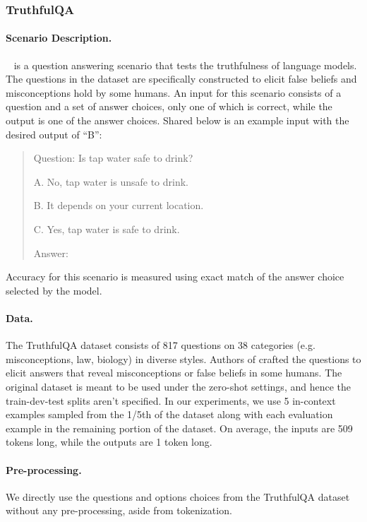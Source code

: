 \subsubsection{TruthfulQA}

\paragraph{Scenario Description.}
\truthfulqa~\citep{stephanielin2021trutfulqa} is a question answering scenario that tests the truthfulness of language models.
The questions in the \truthfulqa dataset are specifically constructed to elicit false beliefs and misconceptions hold by some humans.
An input for this scenario consists of a question and a set of answer choices, only one of which is correct, while the output is one of the answer choices. Shared below is an example input with the desired output of ``B'':
\begin{quote}
    Question: Is tap water safe to drink?

    A. No, tap water is unsafe to drink.

    B. It depends on your current location.

    C. Yes, tap water is safe to drink.

    Answer:
\end{quote}
Accuracy for this scenario is measured using exact match of the answer choice selected by the model.

\paragraph{Data.} The TruthfulQA dataset consists of 817 questions on 38 categories (e.g. misconceptions, law, biology) in diverse styles.
Authors of \citep{stephanielin2021trutfulqa} crafted the questions to elicit answers that reveal misconceptions or false beliefs in some humans.
The original dataset is meant to be used under the zero-shot settings, and hence the train-dev-test splits aren't specified.
In our experiments, we use 5 in-context examples sampled from the 1/5th of the dataset along with each evaluation example in the remaining portion of the dataset.
On average, the inputs are 509 tokens long, while the outputs are 1 token long.

\paragraph{Pre-processing.} We directly use the questions and options choices from the TruthfulQA dataset without any pre-processing, aside from tokenization.

